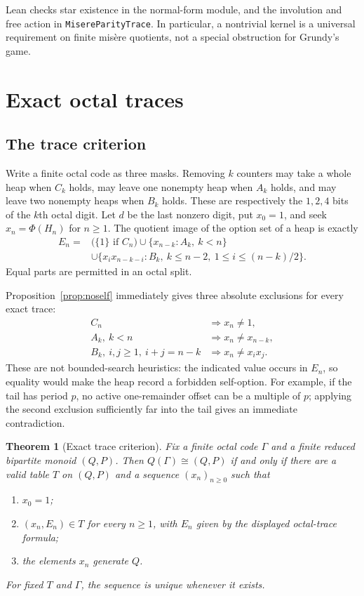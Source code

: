 \documentclass[11pt]{article}
\newtheorem{theorem}{Theorem}[section]
\theoremstyle{definition}
\theoremstyle{remark}
\begin{document}
Lean checks star existence in the normal-form module, and the involution
and free action in \texttt{MisereParityTrace}.
In particular, a nontrivial kernel is a universal requirement on finite
mis\`ere quotients, not a special obstruction for Grundy's game.

\section{Exact octal traces}\label{sec:traces}

\subsection{The trace criterion}

Write a finite octal code as three masks.  Removing $k$ counters may take a
whole heap when $C_k$ holds, may leave one nonempty heap when $A_k$ holds,
and may leave two nonempty heaps when $B_k$ holds.  These are respectively
the $1,2,4$ bits of the $k$th octal digit.  Let $d$ be the last nonzero
digit, put $x_0=1$, and seek $x_n=\Phi(H_n)$ for $n\ge1$.  The quotient
image of the option set of a heap is exactly
\begin{align}
 E_n={}&\bigl(\{1\}\text{ if }C_n\bigr)
 \cup\{x_{n-k}:A_k,\ k<n\}\\
 &\cup\{x_i x_{n-k-i}:B_k,\ k\le n-2,\
                 1\le i\le (n-k)/2\}.\nonumber
\end{align}
Equal parts are permitted in an octal split.

Proposition~\ref{prop:noself} immediately gives three absolute exclusions for
every exact trace:
\begin{align}
 C_n&\Longrightarrow x_n\ne1,\\
 A_k,\ k<n&\Longrightarrow x_n\ne x_{n-k},\\
 B_k,\ i,j\ge1,\ i+j=n-k
   &\Longrightarrow x_n\ne x_i x_j.
\end{align}
These are not bounded-search heuristics: the indicated value occurs in
$E_n$, so equality would make the heap record a forbidden self-option.  For
example, if the tail has period $p$, no active one-remainder offset can be a
multiple of $p$; applying the second exclusion sufficiently far into the tail
gives an immediate contradiction.

\begin{theorem}[Exact trace criterion]\label{thm:trace}
Fix a finite octal code $\Gamma$ and a finite reduced bipartite monoid
$(Q,P)$.  Then $Q(\Gamma)\cong(Q,P)$ if and only if there are a valid table
$T$ on $(Q,P)$ and a sequence $(x_n)_{n\ge0}$ such that
\begin{enumerate}
\item $x_0=1$;
\item $(x_n,E_n)\in T$ for every $n\ge1$, with $E_n$ given by
      the displayed octal-trace formula;
\item the elements $x_n$ generate $Q$.
\end{enumerate}
For fixed $T$ and $\Gamma$, the sequence is unique whenever it exists.
\end{theorem}
\end{document}

